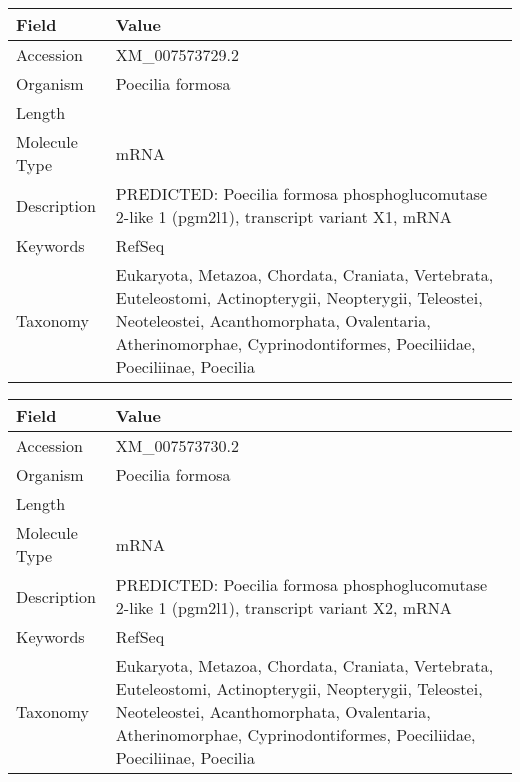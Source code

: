 \documentclass[10pt]{article}
\begin{document}
\vspace{1em}
{\footnotesize
\begin{longtable}{>{\raggedright\arraybackslash}p{4.5cm} >{\raggedright\arraybackslash}p{11.5cm}}
\textbf{Field} & \textbf{Value} \\
\hline
Accession & XM\_007573729.2 \\
Organism & Poecilia formosa \\
Length & 2598 \\
Molecule Type & mRNA \\
Description & PREDICTED: Poecilia formosa phosphoglucomutase 2-like 1 (pgm2l1), transcript variant X1, mRNA \\
Keywords & RefSeq \\
Taxonomy & Eukaryota, Metazoa, Chordata, Craniata, Vertebrata, Euteleostomi, Actinopterygii, Neopterygii, Teleostei, Neoteleostei, Acanthomorphata, Ovalentaria, Atherinomorphae, Cyprinodontiformes, Poeciliidae, Poeciliinae, Poecilia \\
\end{longtable}
}

\vspace{1em}
{\footnotesize
\begin{longtable}{>{\raggedright\arraybackslash}p{4.5cm} >{\raggedright\arraybackslash}p{11.5cm}}
\textbf{Field} & \textbf{Value} \\
\hline
Accession & XM\_007573730.2 \\
Organism & Poecilia formosa \\
Length & 2592 \\
Molecule Type & mRNA \\
Description & PREDICTED: Poecilia formosa phosphoglucomutase 2-like 1 (pgm2l1), transcript variant X2, mRNA \\
Keywords & RefSeq \\
Taxonomy & Eukaryota, Metazoa, Chordata, Craniata, Vertebrata, Euteleostomi, Actinopterygii, Neopterygii, Teleostei, Neoteleostei, Acanthomorphata, Ovalentaria, Atherinomorphae, Cyprinodontiformes, Poeciliidae, Poeciliinae, Poecilia \\
\end{longtable}
}
\end{document}
